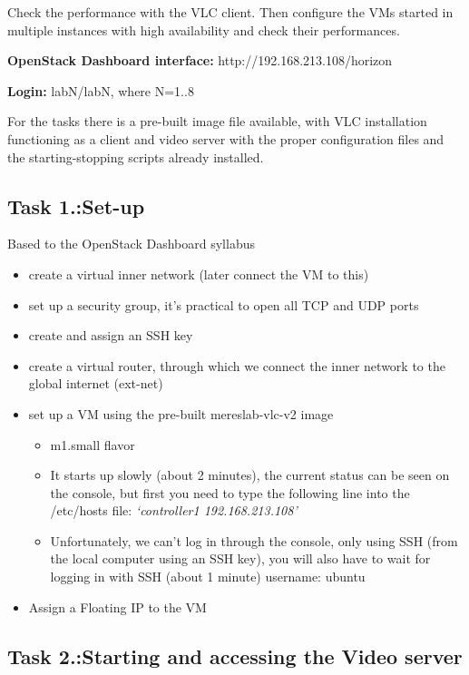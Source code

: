 \documentclass[a4paper]{article}
\begin{document}
\noindent{}Check the performance with the VLC client. Then configure the VMs started in multiple instances with
high availability and check their performances.

\noindent{}\textbf{OpenStack Dashboard interface:} http://192.168.213.108/horizon

\noindent{}\textbf{Login:} labN/labN, where N=1..8

\noindent{}For the tasks there is a pre-built image file available, with VLC installation functioning as a client and video server with the
proper configuration files and the starting-stopping scripts already installed.

\subsection{Task 1.:Set-up}

Based to the OpenStack Dashboard syllabus
\begin{itemize}
\item create a virtual inner network (later connect the VM to this)
\item set up a security group, it's practical to open all TCP and UDP ports
\item create and assign an SSH key
\item create a virtual router, through which we connect the inner network to the global internet (ext-net)
\item set up a VM using the pre-built mereslab-vlc-v2 image
\begin{itemize}
\item m1.small flavor
\item It starts up slowly (about 2 minutes), the current status can be seen on the console, but first you need to type the following line into the /etc/hosts file:
         \emph{`controller1 192.168.213.108'}
\item Unfortunately, we can't log in through the console, only using SSH (from the local computer using an SSH key),
               you will also have to wait for logging in with SSH (about 1 minute)  
       username: ubuntu
\end{itemize}
\item Assign a Floating IP to the VM
\end{itemize}

\subsection{Task 2.:Starting and accessing the Video server}
\end{document}
